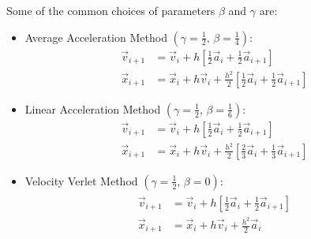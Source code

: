 \documentclass[../Main.tex]{subfiles}
\begin{document}
Some of the common choices of parameters $\beta$ and $\gamma$ are:
\begin{itemize}
	\item Average Acceleration Method $\left(\gamma = \frac{1}{2} \mbox{, } \beta = \frac{1}{4}\right)$:
\begin{align*}
	\vec{v}_{i+1} & = \vec{v}_{i} + h\left[\frac{1}{2}\vec{a}_{i} + \frac{1}{2}\vec{a}_{i+1}\right]\\
	\vec{x}_{i+1} & = \vec{x}_{i} + h\vec{v}_{i} + \frac{h^2}{2}\left[\frac{1}{2}\vec{a}_{i} +\frac{1}{2}\vec{a}_{i+1}\right]
\end{align*}
	\item Linear Acceleration Method $\left(\gamma = \frac{1}{2} \mbox{, } \beta = \frac{1}{6}\right)$:
\begin{align*}
	\vec{v}_{i+1} & = \vec{v}_{i} + h\left[\frac{1}{2}\vec{a}_{i} + \frac{1}{2}\vec{a}_{i+1}\right]\\
	\vec{x}_{i+1} & = \vec{x}_{i} + h\vec{v}_{i} + \frac{h^2}{2}\left[\frac{2}{3}\vec{a}_{i} +\frac{1}{3}\vec{a}_{i+1}\right]
\end{align*}
	\item Velocity Verlet Method $\left(\gamma = \frac{1}{2} \mbox{, } \beta = 0\right)$:
\begin{align}
	\begin{split}
	\vec{v}_{i+1} & = \vec{v}_{i} + h\left[\frac{1}{2}\vec{a}_{i} + \frac{1}{2}\vec{a}_{i+1}\right] \\
	\vec{x}_{i+1} & = \vec{x}_{i} + h\vec{v}_{i} + \frac{h^2}{2}\vec{a}_{i}
	\end{split} \label{eqn:velocity_verlet}
\end{align}
\end{itemize}
\end{document}
